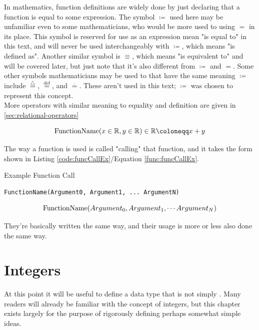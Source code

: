 In mathematics, function definitions are widely done by just declaring that a function is equal to some expression. The symbol $\coloneqq$ used here may be unfamiliar even to some mathematicians, who would be more used to using $=$ in its place. This symbol is reserved for use as an expression mean "is equal to" in this text, and will never be used interchangeably with $\coloneqq$, which means "is defined as". Another similar symbol is $\equiv$, which means "is equivalent to" and will be covered later, but just note that it's also different from $\coloneqq$ and $=$. Some other symbols mathematicians may be used to that have the same meaning $\coloneqq$ include $\stackrel{\triangle}=$, $\stackrel{\text{def}}=$, and $\stackrel{\cdot}=$. These aren't used in this text; $\coloneqq$ was chosen to represent this concept.\\
More operators with similar meaning to equality and definition are given in \ref{sec:relational-operators}

\begin{equation}\label{func:typed-example}
\textnormal{FunctionName}(x\in\mathbb{R}, y\in\mathbb{R})\in\mathbb{R} \coloneqq x+y
\end{equation}

The way a function is used is called "calling" that function, and it takes the form shown in Listing \ref{code:funcCallEx}/Equation \ref{func:funcCallEx}.
\begin{listing}[H]
\caption{Example Function Call}\label{code:funcCallEx}
\begin{verbatim}
FunctionName(Argument0, Argument1, ... ArgumentN)
\end{verbatim}
\end{listing}

\begin{equation}\label{func:funcCallEx}
\textnormal{FunctionName}(Argument_0, Argument_1, \cdots Argument_N)
\end{equation}

They're basically written the same way, and their usage is more or less also done the same way.

\section{Integers}
At this point it will be useful to define a data type that is not simply . Many readers will already be familiar with the concept of integers, but this chapter exists largely for the purpose of rigorously defining perhaps somewhat simple ideas.\\



